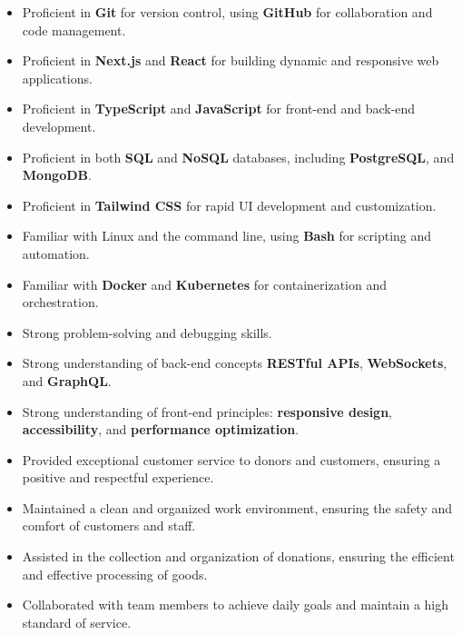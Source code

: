 \documentclass[9pt,a4paper,ragged2e,withhyper]{altacv}
\begin{document}
\begin{paracol}{2}
	\begin{itemize}
		\item Proficient in \textbf{Git} for version control, using \textbf{GitHub} for collaboration and code management.
		\item Proficient in \textbf{Next.js} and \textbf{React} for building dynamic and responsive web applications.
		\item Proficient in \textbf{TypeScript} and \textbf{JavaScript} for front-end and back-end development.
		\item Proficient in both \textbf{SQL} and \textbf{NoSQL} databases, including \textbf{PostgreSQL}, and \textbf{MongoDB}.
		\item Proficient in \textbf{Tailwind CSS} for rapid UI development and customization.
		\item Familiar with Linux and the command line, using \textbf{Bash} for scripting and automation.
		\item Familiar with \textbf{Docker} and \textbf{Kubernetes} for containerization and orchestration.
		\item Strong problem-solving and debugging skills.
		\item Strong understanding of back-end concepts \textbf{RESTful APIs}, \textbf{WebSockets}, and \textbf{GraphQL}.
		\item Strong understanding of front-end principles: \textbf{responsive design}, \textbf{accessibility}, and \textbf{performance optimization}.
	\end{itemize}
\end{paracol}

\newpage


\begin{itemize}
	\item Provided exceptional customer service to donors and customers, ensuring a positive and respectful experience.
	\item Maintained a clean and organized work environment, ensuring the safety and comfort of customers and staff.
	\item Assisted in the collection and organization of donations, ensuring the efficient and effective processing of goods.
	\item Collaborated with team members to achieve daily goals and maintain a high standard of service.
\end{itemize}
\divider
\end{document}
